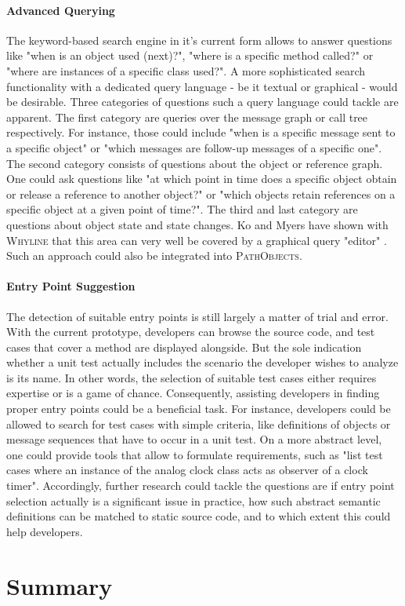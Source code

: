 \paragraph{Advanced Querying} The keyword-based search engine in it's current form allows to answer questions like "when is an object used (next)?", "where is a specific method called?" or "where are instances of a specific class used?".
A more sophisticated search functionality with a dedicated query language - be it textual or graphical - would be desirable.
Three categories of questions such a query language could tackle are apparent.
The first category are queries over the message graph or call tree respectively.
For instance, those could include "when is a specific message sent to a specific object" or "which messages are follow-up messages of a specific one".
The second category consists of questions about the object or reference graph.
One could ask questions like "at which point in time does a specific object obtain or release a reference to another object?" or "which objects retain references on a specific object at a given point of time?".
The third and last category are questions about object state and state changes.
Ko and Myers have shown with \textsc{Whyline} that this area can very well be covered by a graphical query "editor" \cite{ko_debugging_2008}.
Such an approach could also be integrated into \textsc{PathObjects}.

\paragraph{Entry Point Suggestion} The detection of suitable entry points is still largely a matter of trial and error.
With the current prototype, developers can browse the source code, and test cases that cover a method are displayed alongside.
But the sole indication whether a unit test actually includes the scenario the developer wishes to analyze is its name.
In other words, the selection of suitable test cases either requires expertise or is a game of chance.
Consequently, assisting developers in finding proper entry points could be a beneficial task.
For instance, developers could be allowed to search for test cases with simple criteria, like definitions of objects or message sequences that have to occur in a unit test.
On a more abstract level, one could provide tools that allow to formulate requirements, such as "list test cases where an instance of the analog clock class acts as observer of a clock timer".
Accordingly, further research could tackle the questions are if entry point selection actually is a significant issue in practice, how such abstract semantic definitions can be matched to static source code, and to which extent this could help developers.

\section{Summary}
\label{s:ConclusionsSummary}
